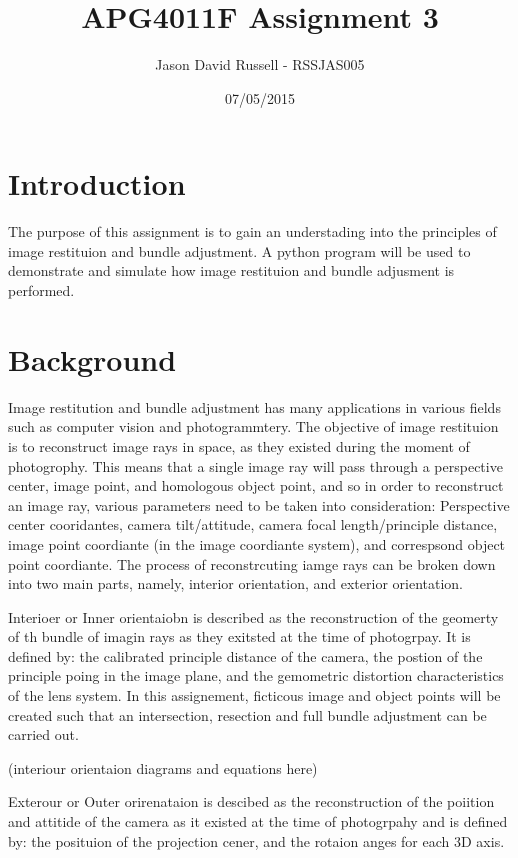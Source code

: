 \documentclass{article}
\title{APG4011F Assignment 3}
\date{07/05/2015}
\author{Jason David Russell - RSSJAS005}
\begin{document}
\maketitle
{}

\newpage
\tableofcontents


\newpage
\section{Introduction}
The purpose of this assignment is to gain an understading into the principles of image restituion and bundle adjustment.
A python program will be used to demonstrate and simulate how image restituion and bundle adjusment is performed.

\section{Background}
Image restitution and bundle adjustment has many applications in various fields such as computer vision and photogrammtery. 
The objective of image restituion is to reconstruct image rays in space, as they existed during the moment of photogrophy. 
This means that a single image ray will pass through a perspective center, image point, and homologous object point, and so
in order to reconstruct an image ray, various parameters need to be taken into consideration:
Perspective center cooridantes, camera tilt/attitude, camera focal length/principle distance, image point coordiante (in the 
image coordiante system), and correspsond object point coordiante.
The process of reconstrcuting iamge rays can be broken down into two main parts, namely, interior orientation, and exterior orientation.

Interioer or Inner orientaiobn is described as the reconstruction of the geomerty of th bundle of imagin rays as they exitsted at the time 
of photogrpay. It is defined by: the calibrated principle distance of the camera, the postion of the principle poing in the image plane, 
and the gemometric distortion characteristics of the lens system.
In this assignement, ficticous image and object points will be created such that an intersection, resection and full bundle adjustment 
can be carried out. 

(interiour orientaion diagrams and equations here)

Exterour or Outer orirenataion is descibed as the reconstruction of the poiition and attitide of the camera as it existed at the time of
photogrpahy and is defined by: the posituion of the projection cener, and the rotaion anges for each 3D axis.
\end{document}
